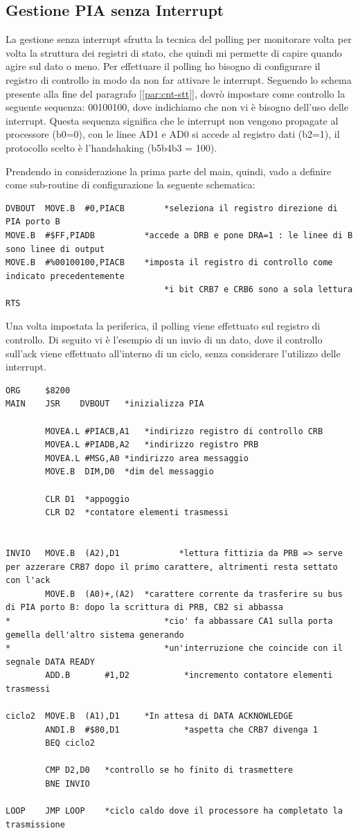 \subsection{Gestione PIA senza Interrupt}\label{par:PIA-INT}
La gestione senza interrupt sfrutta la tecnica del polling per monitorare volta per volta la struttura dei registri di stato, che quindi mi permette di capire quando agire sul dato o meno. Per effettuare il polling ho bisogno di configurare il registro di controllo in modo da non far attivare le interrupt.
Seguendo lo schema presente alla fine del paragrafo [\ref{par:cnt-stt}], dovrò impostare come controllo la seguente sequenza: 00100100, dove indichiamo che non vi è bisogno dell'uso delle interrupt. Questa sequenza significa che le interrupt non vengono propagate al processore (b0=0), con le linee AD1 e AD0 si accede al registro dati (b2=1), il protocollo scelto è l'handshaking (b5b4b3 = 100).

Prendendo in considerazione la prima parte del main, quindi, vado a definire come sub-routine di configurazione la seguente schematica:
\begin{lstlisting}
DVBOUT	MOVE.B	#0,PIACB		*seleziona il registro direzione di PIA porto B 
MOVE.B	#$FF,PIADB	  		*accede a DRB e pone DRA=1 : le linee di B sono linee di output	
MOVE.B	#%00100100,PIACB   	*imposta il registro di controllo come indicato precedentemente
								*i bit CRB7 e CRB6 sono a sola lettura	
RTS
\end{lstlisting}

Una volta impostata la periferica, il polling viene effettuato sul registro di controllo. Di seguito vi è l'esempio di un invio di un dato, dove il controllo sull'ack viene effettuato all'interno di un ciclo, senza considerare l'utilizzo delle interrupt.

\begin{lstlisting}
ORG     $8200
MAIN    JSR    DVBOUT	*inizializza PIA 

        MOVEA.L	#PIACB,A1	*indirizzo registro di controllo CRB
        MOVEA.L	#PIADB,A2	*indirizzo registro PRB
        MOVEA.L	#MSG,A0	*indirizzo area messaggio
        MOVE.B	DIM,D0	*dim del messaggio

        CLR	D1	*appoggio
        CLR	D2	*contatore elementi trasmessi


INVIO	MOVE.B	(A2),D1            *lettura fittizia da PRB => serve per azzerare CRB7 dopo il primo carattere, altrimenti resta settato con l'ack
        MOVE.B	(A0)+,(A2)	*carattere corrente da trasferire su bus di PIA porto B: dopo la scrittura di PRB, CB2 si abbassa
*								*cio' fa abbassare CA1 sulla porta gemella dell'altro sistema generando 
*								*un'interruzione che coincide con il segnale DATA READY
        ADD.B		#1,D2		    *incremento contatore elementi trasmessi

ciclo2	MOVE.B	(A1),D1		*In attesa di DATA ACKNOWLEDGE
        ANDI.B	#$80,D1				*aspetta che CRB7 divenga 1
        BEQ	ciclo2

        CMP	D2,D0	*controllo se ho finito di trasmettere
        BNE	INVIO

LOOP  	JMP LOOP	*ciclo caldo dove il processore ha completato la trasmissione	
\end{lstlisting}

